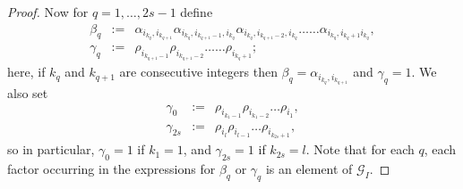 \documentclass[10pt,a4paper]{amsart}
\begin{document}
\begin{proof}
Now for $q=1, \dots, 2s-1$ define 
\begin{eqnarray*}
\beta_q&\!:=\!&\alpha_{i_{k_q},i_{k_{q+1}}} \alpha_{i_{k_q}, i_{k_{q+1}-1}, i_{k_q}} \alpha_{i_{k_q}, i_{k_{q+1}-2}, i_{k_q}} \ldots\ldots \alpha_{i_{k_q}, i_{k_q+1} i_{k_q}}, \\
\gamma_q&\!:=\!& \rho_{i_{k_{q+1}-1}} \rho_{i_{k_{q+1}-2}} \ldots\ldots \rho_{i_{k_q+1}};
\end{eqnarray*}
here, if $k_q$ and $k_{q+1}$ are consecutive integers then $\beta_{q}=\alpha_{i_{k_q},i_{k_{q+1}}}$ and $\gamma_{q}=1$. We also set
\begin{eqnarray*}
\gamma_{0}   &\!:=\!& \rho_{i_{k_{1}-1}} \rho_{i_{k_{1}-2}} \ldots \rho_{i_1},\\
\gamma_{2s} &\!:=\!& \rho_{i_l} \rho_{i_{l-1}} \dots \rho_{i_{k_{2s}+1}} ,
\end{eqnarray*}
so in particular, $\gamma_{0}=1$ if $k_{1}=1$, and $\gamma_{2s}=1$ if $k_{2s}=l$.
Note that for each $q$, each factor occurring in the expressions for $\beta_q$ or $\gamma_q$ is an element of $\mathcal{G}_{I}$. 


\end{proof}
\end{document}
